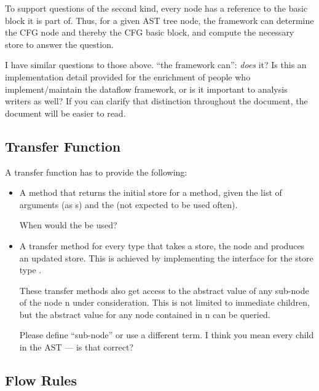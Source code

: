 To support questions of the second kind, every node has a reference
to the basic block it is part of. Thus, for a given AST tree node, the framework
can determine the CFG node and thereby the CFG basic block, and compute the necessary store
to answer the question.

\begin{workinprogress}
I have similar questions to those above.  ``the framework can'':
\emph{does} it?  Is this an implementation detail provided for the
enrichment of people who implement/maintain the dataflow framework, or is
it important to analysis writers as well?  If you can clarify that distinction
throughout the document, the document will be easier to read.
\end{workinprogress}


\subsection{Transfer Function}
\label{sec:transfer-fnc}

A transfer function has to provide the following:
\begin{itemize}
\item A method that returns the initial store for a method, given
the list of arguments (as s)
and the  (not expected to be used often).

\begin{workinprogress}
When would the  be used?
\end{workinprogress}

\item A transfer method for every  type that takes a store, the node and produces
an updated store. This is achieved by implementing the  interface
for the store type .

These transfer methods also get access to the abstract value of any sub-node of the node \code n
under consideration.  This is not limited to immediate children, but the abstract value for any node contained
in \code n can be queried.

\begin{workinprogress}
Please define ``sub-node'' or use a different term.  I think you mean every
child in the AST --- is that correct?
\end{workinprogress}

\end{itemize}


\subsection{Flow Rules}
\label{sec:flow-rules}




